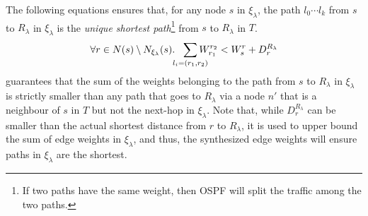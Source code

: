 The following equations ensures that, for any node $s$ in 
$\xi_\lambda$, 
the path $l_0\cdots l_k$ from $s$ to $R_\lambda$ 
in $\xi_\lambda$ is the 
\emph{unique shortest path}\footnote{
If two paths have the same weight, then OSPF will 
split the traffic among the two paths.
} from $s$ to $R_\lambda$ in $T$.
\begin{equation} \label{eq:unique}
\forall r \in N(s) \setminus N_{\xi_\lambda}(s).~~
\sum_{\mathclap{\substack{l_i=(r_1,r_2)}}} 
W_{r_1}^{r_2} < W_{s}^{r}+ D_{r}^{R_\lambda}
\end{equation}
 guarantees that 
the sum of the weights belonging to the path 
from $s$ to $R_\lambda$ in $\xi_\lambda$ 
is strictly smaller than 
any path that goes to $R_\lambda$ via 
a node $n'$ that is a neighbour of $s$ in $T$ but not 
the next-hop in $\xi_\lambda$. Note that,
while $D_{r}^{R_\lambda}$ can be smaller 
than the actual shortest
distance from $r$ to $R_\lambda$, 
it is used to upper bound the sum of edge weights 
in $\xi_\lambda$, and  
thus, the synthesized edge weights will ensure 
paths in $\xi_\lambda$ are the shortest. 

%					
